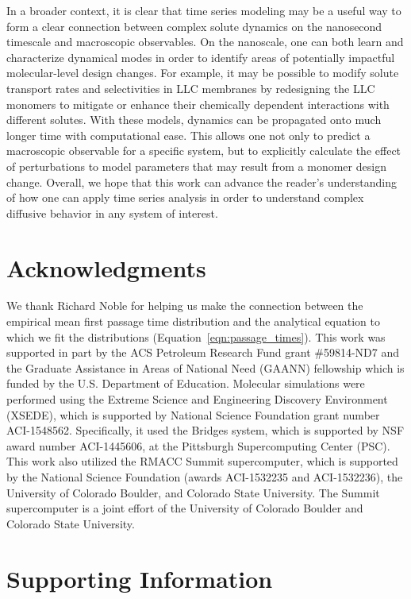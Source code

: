 \documentclass[journal=jctcce,manuscript=article]{achemso}
\begin{document}
  In a broader context, it is clear that time series modeling may be a useful way
  to form a clear connection between complex solute dynamics on the nanosecond 
  timescale and macroscopic observables. On the nanoscale, one can both 
  learn and characterize dynamical modes in order to identify areas of potentially
  impactful molecular-level design changes. For example, it may be possible to 
  modify solute transport rates and selectivities in LLC membranes by redesigning 
  the LLC monomers to mitigate or enhance their chemically dependent interactions
  with different solutes. With these models, dynamics can be propagated onto much 
  longer time with computational ease. This allows one not only to predict a 
  macroscopic observable for a specific system, but to explicitly calculate the 
  effect of perturbations to model parameters that may result from a monomer 
  design change. Overall, we hope that this work can advance the reader's 
  understanding of how one can apply time series analysis in order to understand 
  complex diffusive behavior in any system of interest.

  \section*{Acknowledgments}
  
  We thank Richard Noble for helping us make the connection between the empirical 
  mean first passage time distribution and the analytical equation to which we fit
  the distributions (Equation~\ref{eqn:passage_times}).
  This work was supported in part by the ACS Petroleum Research Fund grant
  \#59814-ND7 and the Graduate Assistance in Areas of National Need (GAANN)
  fellowship which is funded by the U.S. Department of Education.  Molecular
  simulations were performed using the Extreme Science and Engineering
  Discovery Environment (XSEDE), which is supported by National Science
  Foundation grant number ACI-1548562. Specifically, it used the Bridges
  system, which is supported by NSF award number ACI-1445606, at the Pittsburgh
  Supercomputing Center (PSC). This work also utilized the RMACC Summit
  supercomputer, which is supported by the National Science Foundation (awards
  ACI-1532235 and ACI-1532236), the University of Colorado Boulder, and
  Colorado State University. The Summit supercomputer is a joint effort of the
  University of Colorado Boulder and Colorado State University.

  \section*{Supporting Information}
\end{document}
